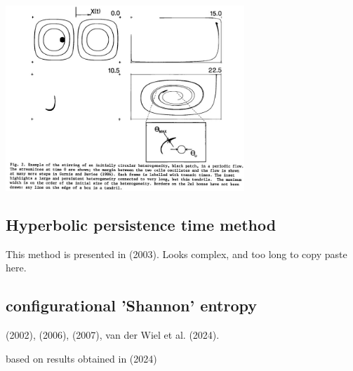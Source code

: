 \begin{center}
\includegraphics[width=9cm]{images/mixing/gurn86}
\end{center}

\subsection{Hyperbolic persistence time method}

This method is presented in \textcite{fasa03} (2003).
Looks complex, and too long to copy paste here.



\subsection{configurational 'Shannon' entropy}

\textcite{gobo02} (2002), 
\textcite{cakm06} (2006),
\textcite{nake07} (2007), 
van der Wiel et al. (2024). 

based on results obtained in \textcite{vavt24} (2024)


